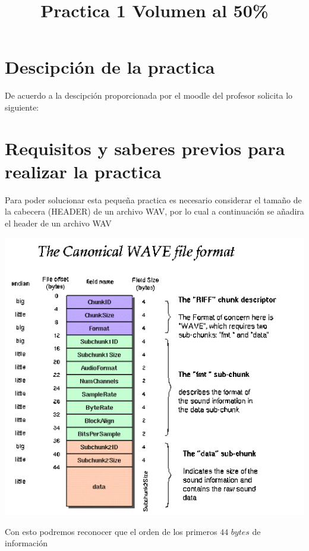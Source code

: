 \documentclass[10pt,executivepaper]{article}
\title{Practica 1 Volumen al 50\%}
\begin{document}
  \maketitle
  \section{Descipción de la practica}
  De acuerdo a la descipción proporcionada por el moodle del profesor solicita lo siguiente:
  \begin{center}
    
  \end{center}
  \clearpage
  \section{Requisitos y saberes previos para realizar la practica}
  Para poder solucionar esta pequeña practica es necesario considerar el tamaño de la cabecera (HEADER) de un archivo WAV, por lo cual a continuación se añadira el header de un archivo WAV
  \begin{center}
    \includegraphics[scale=0.75]{imgs/wavHeader.png}
  \end{center}
  Con esto podremos reconocer que el orden de los primeros $44$ $bytes$ de información 
\end{document}

